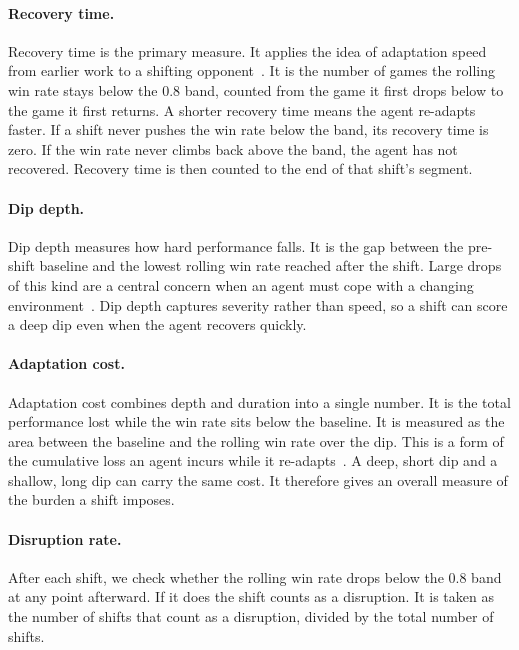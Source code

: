 \documentclass[sigconf,nonacm]{acmart}
\begin{document}
\paragraph{Recovery time.} Recovery time is the primary measure. It applies the
idea of adaptation speed from earlier work to a shifting
opponent~\cite{alshedivat2018continuous}. It is the number of games the rolling
win rate stays below the $0.8$ band, counted from the game it first drops below to
the game it first returns. A shorter recovery time means the agent re-adapts
faster. If a shift never pushes the win rate below the band, its recovery time is
zero. If the win rate never climbs back above the band, the agent has not
recovered. Recovery time is then counted to the end of that shift's segment.

\paragraph{Dip depth.} Dip depth measures how hard performance falls. It is the
gap between the pre-shift baseline and the lowest rolling win rate reached after
the shift. Large drops of this kind are a central concern when an agent must cope
with a changing environment~\cite{padakandla2022survey}. Dip depth captures
severity rather than speed, so a shift can score a deep dip even when the agent
recovers quickly.

\paragraph{Adaptation cost.} Adaptation cost combines depth and duration into a
single number. It is the total performance lost while the win rate sits below the
baseline. It is measured as the area between the baseline and the rolling win rate over
the dip. This is a form of the cumulative loss an agent incurs while it
re-adapts~\cite{sutton2018reinforcement}. A deep, short dip and a shallow, long
dip can carry the same cost. It therefore gives an overall measure of the burden a
shift imposes. 

\paragraph{Disruption rate.}
After each shift, we check whether the rolling win rate drops below the $0.8$ band at any point afterward. If it does the shift counts as a disruption. It is taken as the number of shifts that count as a disruption, divided by the total number of shifts.
\end{document}
